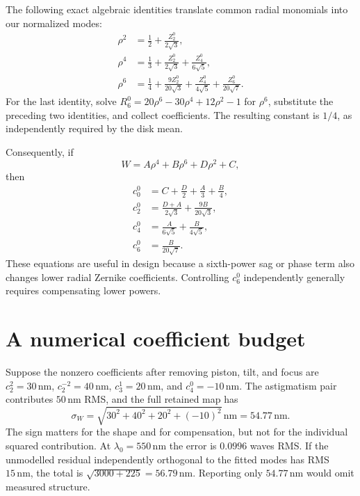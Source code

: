 The following exact algebraic identities translate common radial
monomials into our normalized modes:
\begin{align}
 \rho^2&=\frac12+\frac{Z_2^0}{2\sqrt3},\\
 \rho^4&=\frac13+\frac{Z_2^0}{2\sqrt3}
                        +\frac{Z_4^0}{6\sqrt5},\\
 \rho^6&=\frac14+\frac{9Z_2^0}{20\sqrt3}
                 +\frac{Z_4^0}{4\sqrt5}
                 +\frac{Z_6^0}{20\sqrt7}.
 \label{zc:monomialidentities}
\end{align}
For the last identity, solve
$R_6^0=20\rho^6-30\rho^4+12\rho^2-1$ for $\rho^6$, substitute the
preceding two identities, and collect coefficients. The resulting
constant is $1/4$, as independently required by the disk mean.

Consequently, if
\begin{equation}
 W=A\rho^4+B\rho^6+D\rho^2+C,
\end{equation}
then
\begin{align}
 c_0^0&=C+\frac D2+\frac A3+\frac B4,\\
 c_2^0&=\frac{D+A}{2\sqrt3}+\frac{9B}{20\sqrt3},\\
 c_4^0&=\frac A{6\sqrt5}+\frac B{4\sqrt5},\\
 c_6^0&=\frac B{20\sqrt7}.
 \label{zc:quarticsixth}
\end{align}
These equations are useful in design because a sixth-power sag or phase
term also changes lower radial Zernike coefficients. Controlling
$c_6^0$ independently generally requires compensating lower powers.

\section{A numerical coefficient budget}
Suppose the nonzero coefficients after removing piston, tilt, and focus
are $c_2^2=30\,\mathrm{nm}$, $c_2^{-2}=40\,\mathrm{nm}$,
$c_3^1=20\,\mathrm{nm}$, and $c_4^0=-10\,\mathrm{nm}$.
The astigmatism pair contributes $50\,\mathrm{nm}$ RMS, and the full
retained map has
\begin{equation}
 \sigma_W=\sqrt{30^2+40^2+20^2+(-10)^2}\,\mathrm{nm}
           =54.77\,\mathrm{nm}.
\end{equation}
The sign matters for the shape and for compensation, but not for the
individual squared contribution. At $\lambda_0=550\,\mathrm{nm}$ the
error is $0.0996$ waves RMS. If the unmodelled residual independently
orthogonal to the fitted modes has RMS $15\,\mathrm{nm}$, the total is
$\sqrt{3000+225}=56.79\,\mathrm{nm}$. Reporting only $54.77\,\mathrm{nm}$
would omit measured structure.

